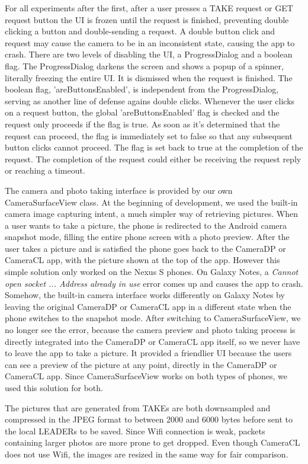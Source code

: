 For all experiments after the first, after a user presses a TAKE request or GET request button the UI is frozen until the request is finished, preventing double clicking a button and double-sending a request. A double button click and request may cause the camera to be in an inconsistent state, causing the app to crash. There are two levels of disabling the UI, a ProgressDialog and a boolean flag. The ProgressDialog darkens the screen and shows a popup of a spinner, literally freezing the entire UI. It is dismissed when the request is finished. The boolean flag, 'areButtonsEnabled', is independent from the ProgressDialog, serving as another line of defense agains double clicks. Whenever the user clicks on a request button, the global 'areButtonsEnabled' flag is checked and the request only proceeds if the flag is true. As soon as it's determined that the request can proceed, the flag is immediately set to false so that any subsequent button clicks cannot proceed. The flag is set back to true at the completion of the request. The completion of the request could either be receiving the request reply or reaching a timeout.

The camera and photo taking interface is provided by our own CameraSurfaceView class. At the beginning of development, we used the built-in camera image capturing intent, a much simpler way of retrieving pictures. When a user wants to take a picture, the phone is redirected to the Android camera snapshot mode, filling the entire phone screen with a photo preview. After the user takes a picture and is satisfied the phone goes back to the CameraDP or CameraCL app, with the picture shown at the top of the app. However this simple solution only worked on the Nexus S phones. On Galaxy Notes, a {\it Cannot open socket ... Address already in use} error comes up and causes the app to crash. Somehow, the built-in camera interface works differently on Galaxy Notes by leaving the original CameraDP or CameraCL app in a different state when the phone switches to the snapshot mode. After switching to CameraSurfaceView, we no longer see the error, because the camera preview and photo taking process is directly integrated into the CameraDP or CameraCL app itself, so we never have to leave the app to take a picture. It provided a friendlier UI because the users can see a preview of the picture at any point, directly in the CameraDP or CameraCL app. Since CameraSurfaceView works on both types of phones, we used this solution for both.

The pictures that are generated from TAKEs are both downsampled and compressed in the JPEG format to between 2000 and 6000 bytes before sent to the local LEADERs to be saved. Since Wifi connection is weak, packets containing larger photos are more prone to get dropped. Even though CameraCL does not use Wifi, the images are resized in the same way for fair comparison.
